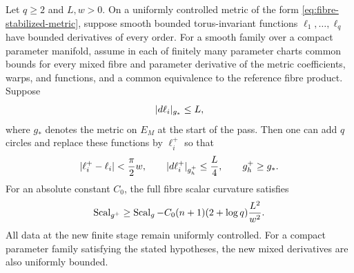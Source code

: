 \begin{lemma}\label{lem:one-pass}
Let $q\ge2$ and $L,w>0$. On a uniformly controlled metric of the form
\eqref{eq:fibre-stabilized-metric}, suppose smooth bounded torus-invariant
functions $\ell_1,\ldots,\ell_q$ have bounded derivatives of every order.
For a smooth family over a compact parameter manifold, assume in each of
finitely many parameter charts common bounds for every mixed fibre and
parameter derivative of the metric coefficients, warps, and functions,
and a common equivalence to the reference fibre product. Suppose
\[
 \lvert d\ell_i\rvert_{g_*}\le L,
\]
where $g_*$ denotes the metric on $E_M$ at the start of the pass. Then one
can add $q$ circles and replace these functions by $\ell_i^+$ so that
\begin{equation}\label{eq:pass-function-bounds}
 \lvert\ell_i^+-\ell_i\rvert<\frac\pi2w,
 \qquad \lvert d\ell_i^+\rvert_{g_h^+}\le\frac L4,
 \qquad g_h^+\ge g_*.
\end{equation}
For an absolute constant $C_0$, the full fibre scalar curvature satisfies
\begin{equation}\label{eq:pass-scalar-bound}
 \operatorname{Scal}_{g^+}\ge\operatorname{Scal}_g
       -C_0(n+1)(2+\log q)\frac{L^2}{w^2}.
\end{equation}
All data at the new finite stage remain uniformly controlled. For a compact
parameter family satisfying the stated hypotheses, the new mixed derivatives
are also uniformly bounded.
\end{lemma}

